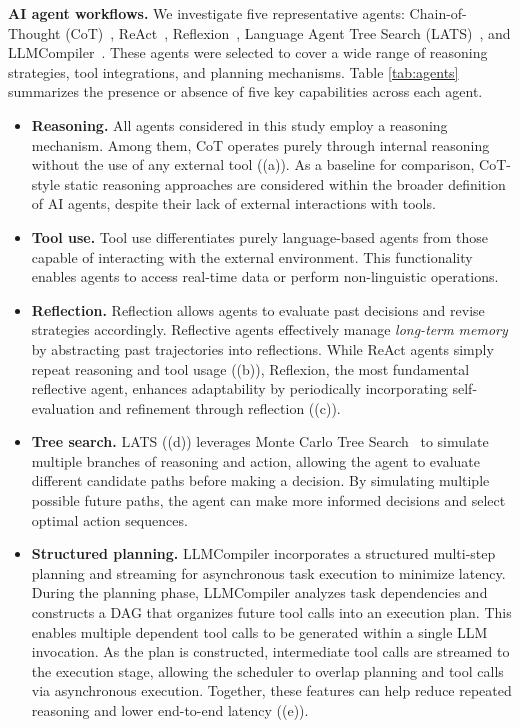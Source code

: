 \textbf{AI agent workflows.} 
We investigate five representative agents: Chain-of-Thought (CoT)~\cite{cot}, ReAct~\cite{react}, Reflexion~\cite{reflexion}, Language Agent Tree Search (LATS)~\cite{lats}, and LLMCompiler~\cite{llmcompiler}. These agents were selected to cover a wide range of reasoning strategies, tool integrations, and planning mechanisms. Table \ref{tab:agents} summarizes the presence or absence of five key capabilities across each agent.

\begin{itemize}[leftmargin=1em]
    \item \textbf{Reasoning.} All agents considered in this study employ a reasoning mechanism. Among them, CoT operates purely through internal reasoning without the use of any external tool ((a)). As a baseline for comparison, CoT-style static reasoning approaches are considered within the broader definition of AI agents, despite their lack of external interactions with tools.
    
    \item \textbf{Tool use.} Tool use differentiates purely language-based agents from those capable of interacting with the external environment. This functionality enables agents to access real-time data or perform non-linguistic operations.

    \item \textbf{Reflection.} Reflection allows agents to evaluate past decisions and revise strategies accordingly. Reflective agents effectively manage \emph{long-term memory} by abstracting past trajectories into reflections. While ReAct agents simply repeat reasoning and tool usage ((b)), Reflexion, the most fundamental reflective agent, enhances adaptability by periodically incorporating self-evaluation and refinement through reflection ((c)).

    \item \textbf{Tree search.} LATS ((d)) leverages Monte Carlo Tree Search~\cite{mcts} to simulate multiple branches of reasoning and action, allowing the agent to evaluate different candidate paths before making a decision. By simulating multiple possible future paths, the agent can make more informed decisions and select optimal action sequences.

    \item \textbf{Structured planning.} LLMCompiler incorporates a structured multi-step planning and streaming for asynchronous task execution to minimize latency. During the planning phase, LLMCompiler analyzes task dependencies and constructs a DAG that organizes future tool calls into an execution plan. This enables multiple dependent tool calls to be generated within a single LLM invocation. As the plan is constructed, intermediate tool calls are streamed to the execution stage, allowing the scheduler to overlap planning and tool calls via asynchronous execution. Together, these features can help reduce repeated reasoning and lower end-to-end latency ((e)).
\end{itemize}

